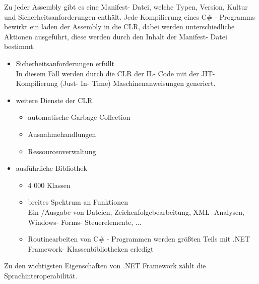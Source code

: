 \documentclass[12pt,a4paper]{report}
\begin{document}
\begin{onehalfspace}
Zu jeder Assembly gibt es eine Manifest- Datei, welche Typen, Version, Kultur und Sicherheitsanforderungen enthält. Jede Kompilierung eines C\# - Programms bewirkt ein laden der Assembly in die CLR, dabei werden unterschiedliche Aktionen ausgeführt, diese werden durch den Inhalt der Manifest- Datei bestimmt. \\
\begin{itemize}
\item Sicherheitsanforderungen erfüllt\\
In diesem Fall werden durch die CLR der IL- Code mit der JIT- Kompilierung (Just- In- Time) Maschinenanweisungen generiert.
\item weitere Dienste der CLR
\begin{itemize}
\item automatische Garbage Collection
\item Ausnahmehandlungen
\item Ressourcenverwaltung
\end{itemize}
\item ausführliche Bibliothek
\begin{itemize}
\item 4 000 Klassen
\item breites Spektrum an Funktionen\\
Ein-/Ausgabe von Dateien, Zeichenfolgebearbeitung, XML- Analysen, Windows- Forms- Steuerelemente, ...
\item Routinearbeiten von C\# - Programmen werden größten Teils mit .NET Framework- Klassenbibliotheken erledigt
\end{itemize}
\end{itemize}
Zu den wichtigsten Eigenschaften von .NET Framework zählt die Sprachinteroperabilität.\\


\end{onehalfspace}
\end{document}

